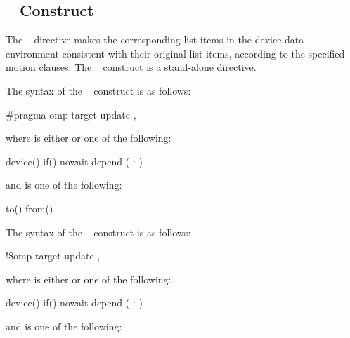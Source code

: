 \subsection{~ Construct}
\label{subsec:target update Construct}
\summary
The ~ directive makes the corresponding list items in the device data 
environment consistent with their original list items, according to the specified motion 
clauses. The ~ construct is a stand-alone directive.

\syntax
\ccppspecificstart
The syntax of the ~ construct is as follows:

\begin{boxedcode}
\#pragma omp target update \plc{clause[ [},\plc{] clause] ... ] new-line}
\end{boxedcode}
where  is either  or one of the following:

\begin{indentedcodelist}
device()
if()
nowait
depend ( : )
\end{indentedcodelist}

and  is one of the following:

\begin{indentedcodelist}
to()
from()
\end{indentedcodelist}
\ccppspecificend

\fortranspecificstart
The syntax of the ~ construct is as follows:

\begin{boxedcode}
!\$omp target update \plc{clause[ [},\plc{] clause] ... ]}
\end{boxedcode}

where  is either  or one of the following:

\begin{indentedcodelist}
device()
if()
nowait
depend ( : )
\end{indentedcodelist}

and  is one of the following:

